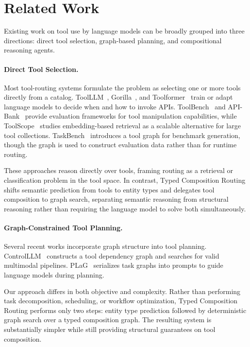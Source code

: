 \section{Related Work}
\label{sec:related-work}

Existing work on tool use by language models can be broadly grouped into three directions: direct tool selection, graph-based planning, and compositional reasoning agents.

\paragraph{Direct Tool Selection.}

Most tool-routing systems formulate the problem as selecting one or more tools directly from a catalog.
ToolLLM~\cite{qin2024toolllm}, Gorilla~\cite{patil2024gorilla}, and Toolformer~\cite{schick2023toolformer} train or adapt language models to decide when and how to invoke APIs.
ToolBench~\cite{xu2023toolbench} and API-Bank~\cite{li2023apibank} provide evaluation frameworks for tool manipulation capabilities, while ToolScope~\cite{li2025toolscope} studies embedding-based retrieval as a scalable alternative for large tool collections.
TaskBench~\cite{shen2024taskbench} introduces a tool graph for benchmark generation, though the graph is used to construct evaluation data rather than for runtime routing.

These approaches reason directly over tools, framing routing as a retrieval or classification problem in the tool space.
In contrast, Typed Composition Routing shifts semantic prediction from tools to entity types and delegates tool composition to graph search, separating semantic reasoning from structural reasoning rather than requiring the language model to solve both simultaneously.

\paragraph{Graph-Constrained Tool Planning.}

Several recent works incorporate graph structure into tool planning.
ControlLLM~\cite{zhang2024controlllm} constructs a tool dependency graph and searches for valid multimodal pipelines.
PLaG~\cite{lin2024plag} serializes task graphs into prompts to guide language models during planning.

Our approach differs in both objective and complexity.
Rather than performing task decomposition, scheduling, or workflow optimization, Typed Composition Routing performs only two steps: entity type prediction followed by deterministic graph search over a typed composition graph.
The resulting system is substantially simpler while still providing structural guarantees on tool composition.

